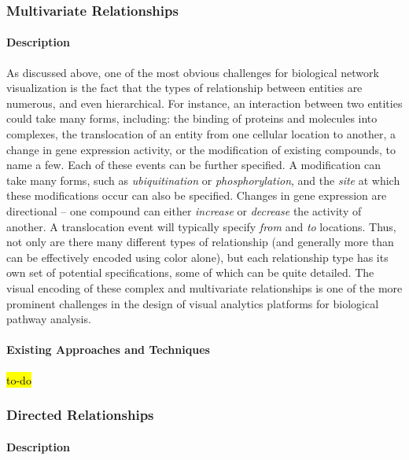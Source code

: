\subsubsection{Multivariate Relationships}

\paragraph{Description}

As discussed above, one of the most obvious challenges for biological network visualization is the fact that the types of relationship between entities are numerous, and even hierarchical.
For instance, an interaction between two entities could take many forms, including: the binding of proteins and molecules into complexes, the translocation of an entity from one cellular location to another, a change in gene expression activity, or the modification of existing compounds, to name a few.
Each of these events can be further specified.
A modification can take many forms, such as \textit{ubiquitination} or \textit{phosphorylation}, and the \textit{site} at which these modifications occur can also be specified.
Changes in gene expression are directional -- one compound can either \textit{increase} or \textit{decrease} the activity of another.
A translocation event will typically specify \textit{from} and \textit{to} locations.
Thus, not only are there many different types of relationship (and generally more than can be effectively encoded using color alone), but each relationship type has its own set of potential specifications, some of which can be quite detailed.
The visual encoding of these complex and multivariate relationships is one of the more prominent challenges in the design of visual analytics platforms for biological pathway analysis.

\paragraph{Existing Approaches and Techniques}

\hl{to-do}

\subsubsection{Directed Relationships}

\paragraph{Description}


